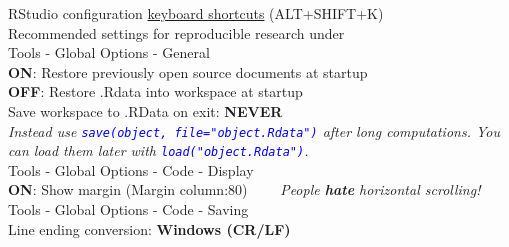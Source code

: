 \documentclass[xcolor=table,           xcolor=dvipsnames]{beamer}\usepackage[]{graphicx}\usepackage[]{color}
\newcommand{\rcode}[1]{\texttt{\textcolor{Blue}{#1}}} %
\begin{document}

\begin{frame}{RStudio configuration}
\href{https://support.rstudio.com/hc/en-us/articles/200711853-Keyboard-Shortcuts}{keyboard shortcuts} (ALT+SHIFT+K)\\[1em]
\pause
Recommended settings for reproducible research under\\
\alert{Tools - Global Options - General}\\
\textbf{ON}: Restore previously open source documents at startup\\
\textbf{OFF}: Restore .Rdata into workspace at startup\\
Save workspace to .RData on exit: \textbf{NEVER}\\[0.5em]
\pause
\textit{Instead use \rcode{save(object, file="object.Rdata")} after long computations.
You can load them later with \rcode{load("object.Rdata")}.}\\[1em]
\pause
\alert{Tools - Global Options - Code - Display}\\
\textbf{ON}: Show margin (Margin column:80) ~~~~\textit{People \textbf{hate} horizontal scrolling!}\\[0.5em]
\alert{Tools - Global Options - Code - Saving}\\
Line ending conversion: \textbf{Windows (CR/LF)}
\end{frame}

\end{document}

